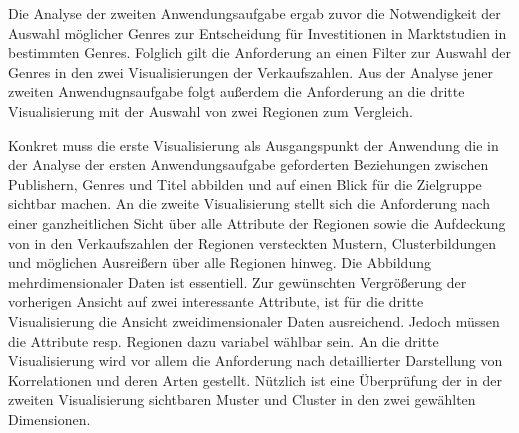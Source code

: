 \documentclass[usegeometry=true]{scrartcl}
\begin{document}
Die Analyse der zweiten Anwendungsaufgabe ergab zuvor die Notwendigkeit der Auswahl möglicher Genres zur Entscheidung für Investitionen in Marktstudien in bestimmten Genres.
Folglich gilt die Anforderung an einen Filter zur Auswahl der Genres in den zwei Visualisierungen der Verkaufszahlen. 
Aus der Analyse jener zweiten Anwendugnsaufgabe folgt außerdem die Anforderung an die dritte Visualisierung mit der Auswahl von zwei Regionen zum Vergleich. 

Konkret muss die erste Visualisierung als Ausgangspunkt der Anwendung die in der Analyse der ersten Anwendungsaufgabe geforderten Beziehungen zwischen Publishern, Genres und Titel abbilden und auf einen Blick für die Zielgruppe sichtbar machen.
An die zweite Visualisierung stellt sich die Anforderung nach einer ganzheitlichen Sicht über alle Attribute der Regionen sowie die Aufdeckung von in den Verkaufszahlen der Regionen versteckten Mustern, Clusterbildungen und möglichen Ausreißern über alle Regionen hinweg.
Die Abbildung mehrdimensionaler Daten ist essentiell.
Zur gewünschten Vergrößerung der vorherigen Ansicht auf zwei interessante Attribute, ist für die dritte Visualisierung die Ansicht zweidimensionaler Daten ausreichend.
Jedoch müssen die Attribute resp. Regionen dazu variabel wählbar sein. 
An die dritte Visualisierung wird vor allem die Anforderung nach detaillierter Darstellung von Korrelationen und deren Arten gestellt. 
Nützlich ist eine Überprüfung der in der zweiten Visualisierung sichtbaren Muster und Cluster in den zwei gewählten Dimensionen.

\end{document}
